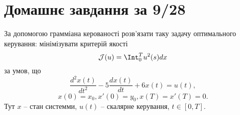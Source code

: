 \setcounter{section}{3}



\section{Домашнє завдання за 9/28}

\setcounter{section}{3}
\setcounter{problem}{9}
\begin{problem}
    За допомогою грамміана керованості розв'язати таку задачу оптимального керування: мінімізувати критерій якості
    \[ \mathcal{J}(u) = \Int_0^T u^2(s) dx \]
    за умов, що
    \[ \dfrac{d^2x(t)}{dt^2} - 5\dfrac{dx(t)}{dt} + 6x(t) = u(t), \]
    \[ x(0) = x_0, x'(0) = y_0, x(T) = x'(T) = 0.\]
    Тут $x$ -- стан системми, $u(t)$ -- скалярне керування, $t \in [0, T]$.
\end{problem}

